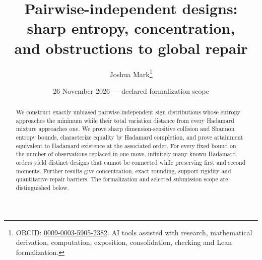 \documentclass[11pt]{article}
\title{Pairwise-independent designs: sharp entropy, concentration,\\and obstructions to global repair}
\author{Joshua Mark\thanks{ORCID: \href{https://orcid.org/0009-0003-5905-2382}{0009-0003-5905-2382}. AI tools assisted with research, mathematical derivation, computation, exposition, consolidation, checking and Lean formalization.}}
\date{26 November 2026 --- declared formalization scope}
\begin{document}
\maketitle
\begin{abstract}
We construct exactly unbiased pairwise-independent sign distributions whose
entropy approaches the minimum while their total variation distance from
every Hadamard mixture approaches one. We prove sharp dimension-sensitive
collision and Shannon entropy bounds, characterize equality by Hadamard
completion, and prove attainment equivalent to Hadamard existence at the
associated order. For every fixed bound on the number of observations
replaced in one move, infinitely many known Hadamard orders yield distinct
designs that cannot be connected while preserving first and second moments.
Further results give concentration, exact rounding, support rigidity and
quantitative repair barriers. The formalization and selected submission
scope are distinguished below.
\end{abstract}

\tableofcontents
\end{document}

